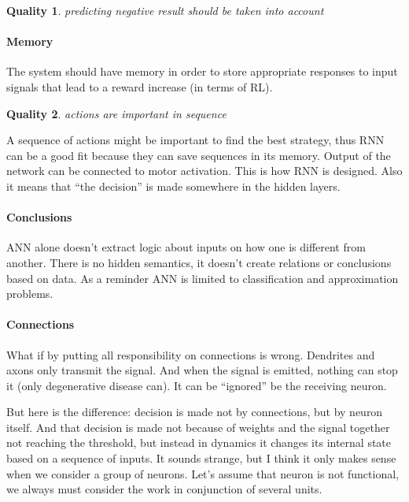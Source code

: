 \documentclass[draft]{article}
\newtheorem{Qual}{Quality}
\begin{document}
\begin{Qual}\label{q2}
  predicting negative result should be taken into account
\end{Qual}

\paragraph{Memory}

The system should have memory in order to store appropriate responses to input signals that lead to a reward increase (in terms of RL).

\begin{Qual}\label{q3}
  actions are important in sequence
\end{Qual}

A sequence of actions might be important to find the best strategy, thus RNN can be a good fit because they can save sequences in its memory. Output of the network can be connected to motor activation. This is how RNN is designed. Also it means that “the decision” is made somewhere in the hidden layers. 



\paragraph{Conclusions}
ANN alone doesn’t extract logic about inputs on how one is different from another. There is no hidden semantics, it doesn’t create relations or conclusions based on data. As a reminder ANN is limited to classification and approximation problems.



\paragraph{Connections}
What if by putting all responsibility on connections is wrong. Dendrites and axons only transmit the signal. And when the signal is emitted, nothing can stop it (only degenerative disease can). It can be “ignored” be the receiving neuron.

But here is the difference: decision is made not by connections, but by neuron itself. And that decision is made not because of weights and the signal together not reaching the threshold, but instead in dynamics it changes its internal state based on a sequence of inputs. It sounds strange, but I think it only makes sense when we consider a group of neurons. Let’s assume that neuron is not functional, we always must consider the work in conjunction of several units. 
\end{document}
